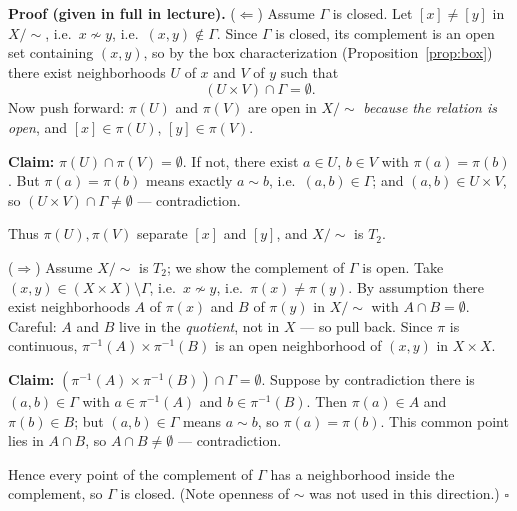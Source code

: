 \documentclass[11pt]{report}
\renewenvironment{proof}[1][Proof]{\noindent\textbf{#1.} }{\hfill$\square$\par\vspace{5pt}}
\begin{document}
\begin{proof}[Proof (given in full in lecture)]
($\Leftarrow$) Assume $\Gamma$ is closed. Let $[x] \neq [y]$ in $X/{\sim}$, i.e.\ $x \not\sim y$, i.e.\ $(x, y) \notin \Gamma$. Since $\Gamma$ is closed, its complement is an open set containing $(x,y)$, so by the box characterization (Proposition~\ref{prop:box}) there exist neighborhoods $U$ of $x$ and $V$ of $y$ such that
\[
(U \times V) \cap \Gamma = \emptyset.
\]
Now push forward: $\pi(U)$ and $\pi(V)$ are open in $X/{\sim}$ \emph{because the relation is open}, and $[x] \in \pi(U)$, $[y] \in \pi(V)$.

\textbf{Claim:} $\pi(U) \cap \pi(V) = \emptyset$. If not, there exist $a \in U$, $b \in V$ with $\pi(a) = \pi(b)$. But $\pi(a) = \pi(b)$ means exactly $a \sim b$, i.e.\ $(a, b) \in \Gamma$; and $(a,b) \in U \times V$, so $(U \times V) \cap \Gamma \neq \emptyset$ --- contradiction.

Thus $\pi(U), \pi(V)$ separate $[x]$ and $[y]$, and $X/{\sim}$ is $T_2$.

($\Rightarrow$) Assume $X/{\sim}$ is $T_2$; we show the complement of $\Gamma$ is open. Take $(x, y) \in (X \times X) \setminus \Gamma$, i.e.\ $x \not\sim y$, i.e.\ $\pi(x) \neq \pi(y)$. By assumption there exist neighborhoods $A$ of $\pi(x)$ and $B$ of $\pi(y)$ in $X/{\sim}$ with $A \cap B = \emptyset$. Careful: $A$ and $B$ live in the \emph{quotient}, not in $X$ --- so pull back. Since $\pi$ is continuous, $\pi^{-1}(A) \times \pi^{-1}(B)$ is an open neighborhood of $(x, y)$ in $X \times X$.

\textbf{Claim:} $\left(\pi^{-1}(A) \times \pi^{-1}(B)\right) \cap \Gamma = \emptyset$. Suppose by contradiction there is $(a, b) \in \Gamma$ with $a \in \pi^{-1}(A)$ and $b \in \pi^{-1}(B)$. Then $\pi(a) \in A$ and $\pi(b) \in B$; but $(a,b) \in \Gamma$ means $a \sim b$, so $\pi(a) = \pi(b)$. This common point lies in $A \cap B$, so $A \cap B \neq \emptyset$ --- contradiction.

Hence every point of the complement of $\Gamma$ has a neighborhood inside the complement, so $\Gamma$ is closed. (Note openness of $\sim$ was not used in this direction.)
\end{proof}
\end{document}
